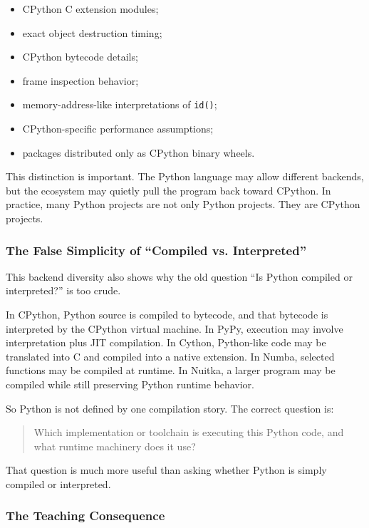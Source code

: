\begin{itemize}
    \item CPython C extension modules;
    \item exact object destruction timing;
    \item CPython bytecode details;
    \item frame inspection behavior;
    \item memory-address-like interpretations of \texttt{id()};
    \item CPython-specific performance assumptions;
    \item packages distributed only as CPython binary wheels.
\end{itemize}

This distinction is important. The Python language may allow different backends, but the ecosystem may quietly pull the program back toward CPython. In practice, many Python projects are not only Python projects. They are CPython projects.

\subsubsection{The False Simplicity of “Compiled vs. Interpreted”}

This backend diversity also shows why the old question ``Is Python compiled or interpreted?'' is too crude.

In CPython, Python source is compiled to bytecode, and that bytecode is interpreted by the CPython virtual machine. In PyPy, execution may involve interpretation plus JIT compilation. In Cython, Python-like code may be translated into C and compiled into a native extension. In Numba, selected functions may be compiled at runtime. In Nuitka, a larger program may be compiled while still preserving Python runtime behavior.

So Python is not defined by one compilation story. The correct question is:

\begin{quote}
Which implementation or toolchain is executing this Python code, and what runtime machinery does it use?
\end{quote}

That question is much more useful than asking whether Python is simply compiled or interpreted.

\subsubsection{The Teaching Consequence}

